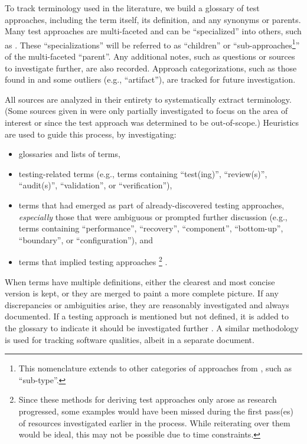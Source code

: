 To track terminology used in the literature, we build a glossary of test
approaches, including the term itself, its definition, and
any synonyms or parents. Many test approaches are multi-faceted and can be
``specialized'' into others, such as . These
``specializations'' will be referred to as ``children'' or
``sub-approaches\footnote{This nomenclature extends to other categories of
    approaches from , such as ``sub-type''.}''
of the multi-faceted
``parent''. Any additional notes, such as questions or sources to investigate
further, are also recorded. Approach categorizations, such as those found in
 and some outliers (e.g., ``artifact''), are tracked
for future investigation.

All sources are analyzed in their entirety to systematically extract
terminology. (Some sources given in 
were only partially investigated to focus on the area of interest or since
the test approach was determined to be out-of-scope.)
Heuristics are used to guide this process, by investigating:

\begin{itemize}
    \item glossaries and lists of terms,
    \item testing-related terms (e.g., terms containing ``test(ing)'',
          \ifnotpaper ``review(s)'', ``audit(s)'', \fi
          ``validation'', or ``verification''),
    \item terms that had emerged as part of already-discovered
          testing approaches, \emph{especially} those that were ambiguous
          or prompted further discussion (e.g., terms containing
          ``performance'', ``recovery'', ``component'', ``bottom-up'',
          \ifnotpaper ``boundary'', \fi or ``configuration''), and
    \item terms that implied testing approaches%
          \ifnotpaper\footnote{
                  Since these methods for deriving test approaches only arose
                  as research progressed, some examples would have been missed
                  during the first pass(es) of resources investigated earlier
                  in the process. While reiterating over them would be ideal,
                  this may not be possible due to time constraints.
              }\fi%
          .
\end{itemize}

When terms have multiple definitions, either the clearest and most concise
version is kept, or they are merged to paint a more complete picture.
If any discrepancies or ambiguities
arise, they are reasonably investigated and always documented. If a
testing approach is mentioned but not defined, it is added to the
glossary to indicate it should be investigated further%
. A similar methodology
is used for tracking software qualities, albeit in a separate
document.

